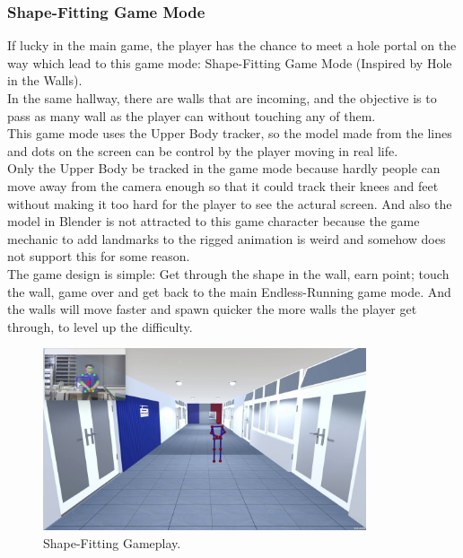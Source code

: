 \documentclass[12pt]{article}
\begin{document}
\clearpage
\subsubsection{Shape-Fitting Game Mode}
\hspace*{1.5em} If lucky in the main game, the player has the chance to meet a hole portal on the way which lead to this game mode: Shape-Fitting Game Mode (Inspired by Hole in the Walls).\\

In the same hallway, there are walls that are incoming, and the objective is to pass as many wall as the player can without touching any of them.\\

This game mode uses the Upper Body tracker, so the model made from the lines and dots on the screen can be control by the player moving in real life.\\

Only the Upper Body be tracked in the game mode because hardly people can move away from the camera enough so that it could track their knees and feet without making it too hard for the player to see the actural screen.
And also the model in Blender is not attracted to this game character because the game mechanic to add landmarks to the rigged animation is weird and somehow does not support this for some reason.\\

The game design is simple: Get through the shape in the wall, earn point; touch the wall, game over and get back to the main Endless-Running game mode. And the walls will move faster and spawn quicker the more walls the player get through, to level up the difficulty.\\

\begin{figure}[h]
    \centering
    \includegraphics[width=0.85\textwidth]{game13.jpg}
    \caption{Shape-Fitting Gameplay.}
\end{figure}
\end{document}
